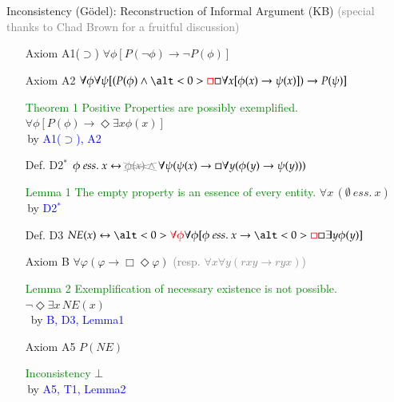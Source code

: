 \documentclass[9pt,mathserif,unknownkeysallowed,xcolor=dvipsnames]{beamer}
\newcommand{\imp}{\rightarrow}
\newcommand{\biimp}{\leftrightarrow}
\newcommand{\allq}{\forall}
\newcommand{\exq}{\exists}
\newcommand{\nec}{\Box} %
\newcommand{\pos}{\Diamond} %
\newcommand{\ess}[2]{#1 \ \mathit{ess.} \ #2}
\newcommand{\NE}{\mathit{NE}}
\begin{document}
\begin{frame}{Inconsistency (G\"odel): Reconstruction of Informal Argument (KB)}
\textcolor{gray}{(special thanks to Chad Brown for a fruitful discussion)} \\[1em]
\begin{flushright}
\begin{minipage}{10cm}%
\begin{itemize}
\item[Axiom A1($\supset$)] \hfill 
  ${\allq \phi} [P(\neg \phi) \imp \neg P(\phi)]$ 
\item[Axiom A2] \hfill 
  ${\allq \phi \allq \psi} [(P(\phi) \wedge \alt<0>{\textcolor{red}{\nec}}{\nec} \allq x [\phi(x)
  \imp \psi(x)]) \imp P(\psi)]$ 
\pause
\item[\textcolor{Green}{Theorem 1}] \textcolor{Green}{Positive Properties are possibly
  exemplified.} \hfill ${\allq \phi} [P(\phi) \imp {\pos}  \exq x
  \phi(x)]$ \\
\,\hfill by \textcolor{Blue}{A1($\supset$), A2} \\[.5cm]
\pause
\item[Def. D2$^*$] \hfill ${\ess{\phi}{x} \biimp \textcolor{gray}{\xcancel{\phi(x)\
      \wedge}\ }  {\allq \psi} (\psi(x)
    \imp {\nec} \allq y (\phi(y) \imp \psi(y)))}$ 
\pause
\item[\textcolor{Green}{Lemma 1}] \textcolor{Green}{The empty property is an essence of
  every entity.} \hfill $\allq x\,(\ess{\emptyset}{x})$ \\
\,\hfill by \textcolor{Blue}{D2$^*$} \\[.5cm]
\pause
\item[Def. D3] 
   \hfill ${\NE(x) \biimp \alt<0>{\textcolor{red}{\allq \phi}}{\allq
       \phi} [\ess{\phi}{x} \imp \alt<0>{\textcolor{red}{\nec}}{\nec}
     \exq y \phi(y)]}$
\item[Axiom B]  \hfill $\forall
  \varphi (\varphi \imp \Box \Diamond \varphi)$ \quad \textcolor{gray}{(resp.
$\forall x \forall y (r x y \imp r y x)$)}
\pause
 \item[\textcolor{Green}{Lemma 2}] \textcolor{Green}{Exemplification of necessary
   existence is not possible.} \hfill  $\neg \pos \exists x\, \NE(x)$
   \\
\, \hfill by \textcolor{Blue}{B, D3, Lemma1} \\[.5cm]
 \pause
\item[Axiom A5] \hfill ${P(\NE)}$ 



\pause
\item[]  \textcolor{Green}{Inconsistency} \hfill $\bot$ \\
\,\hfill by \textcolor{Blue}{A5, T1, Lemma2} \\[.5cm]
\end{itemize}
\end{minipage}
\end{flushright}
\end{frame}
\end{document}
